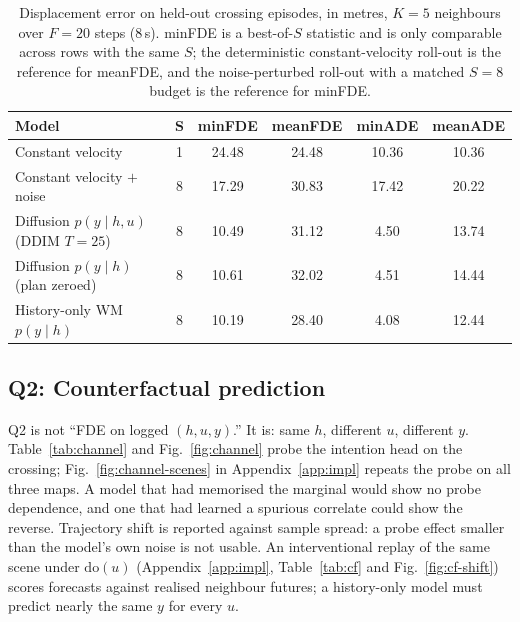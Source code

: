 \documentclass[conference]{IEEEtran}
\newcommand{\cvMinFDE}{24.48}
\newcommand{\cvMeanFDE}{24.48}
\newcommand{\cvMinADE}{10.36}
\newcommand{\cvMeanADE}{10.36}
\newcommand{\cvsMinFDE}{17.29}
\newcommand{\cvsMeanFDE}{30.83}
\newcommand{\cvsMinADE}{17.42}
\newcommand{\cvsMeanADE}{20.22}
\newcommand{\wmMinFDE}{10.49}
\newcommand{\wmMeanFDE}{31.12}
\newcommand{\wmMinADE}{4.50}
\newcommand{\wmMeanADE}{13.74}
\newcommand{\wmT}{25}
\newcommand{\wmZeroMinFDE}{10.61}
\newcommand{\wmZeroMeanFDE}{32.02}
\newcommand{\wmZeroMinADE}{4.51}
\newcommand{\wmZeroMeanADE}{14.44}
\newcommand{\histMinFDE}{10.19}
\newcommand{\histMeanFDE}{28.40}
\newcommand{\histMinADE}{4.08}
\newcommand{\histMeanADE}{12.44}
\begin{document}
\begin{table}[!t]
\caption{Displacement error on held-out crossing episodes, in metres, $K=5$ neighbours over $F=20$ steps ($8$\,s). minFDE is a best-of-$S$ statistic and is only comparable across rows with the same $S$; the deterministic constant-velocity roll-out is the reference for meanFDE, and the noise-perturbed roll-out with a matched $S=8$ budget is the reference for minFDE.}
\label{tab:worldmodel}
\centering
\begin{tabular}{|l|c|c|c|c|c|}
\hline
\textbf{Model} & $\boldsymbol{S}$ & \textbf{minFDE} & \textbf{meanFDE} & \textbf{minADE} & \textbf{meanADE} \\
\hline
Constant velocity & 1 & \cvMinFDE{} & \cvMeanFDE{} & \cvMinADE{} & \cvMeanADE{} \\
\hline
Constant velocity $+$ noise & 8 & \cvsMinFDE{} & \cvsMeanFDE{} & \cvsMinADE{} & \cvsMeanADE{} \\
\hline
Diffusion $p(y\mid h,u)$ (DDIM $T{=}\wmT{}$) & 8 & \wmMinFDE{} & \wmMeanFDE{} & \wmMinADE{} & \wmMeanADE{} \\
\hline
Diffusion $p(y\mid h)$ (plan zeroed) & 8 & \wmZeroMinFDE{} & \wmZeroMeanFDE{} & \wmZeroMinADE{} & \wmZeroMeanADE{} \\
\hline
History-only WM $p(y\mid h)$ & 8 & \histMinFDE{} & \histMeanFDE{} & \histMinADE{} & \histMeanADE{} \\
\hline
\end{tabular}
\end{table}

\subsection{Q2: Counterfactual prediction}
\label{sec:exp:channel}

Q2 is not ``FDE on logged $(h,u,y)$.'' It is: same $h$, different $u$, different
$y$. Table~\ref{tab:channel} and Fig.~\ref{fig:channel} probe the intention head on the crossing; Fig.~\ref{fig:channel-scenes} in Appendix~\ref{app:impl} repeats the probe on all three maps. A model that had memorised the marginal would show no probe dependence, and one that had learned a spurious correlate could show the reverse. Trajectory shift is reported against sample spread: a probe effect smaller than the model's own noise is not usable. An interventional replay of the same scene under $\mathrm{do}(u)$
(Appendix~\ref{app:impl}, Table~\ref{tab:cf} and Fig.~\ref{fig:cf-shift})
scores forecasts against realised neighbour futures; a history-only model must predict nearly the same $y$ for every $u$.
\end{document}
